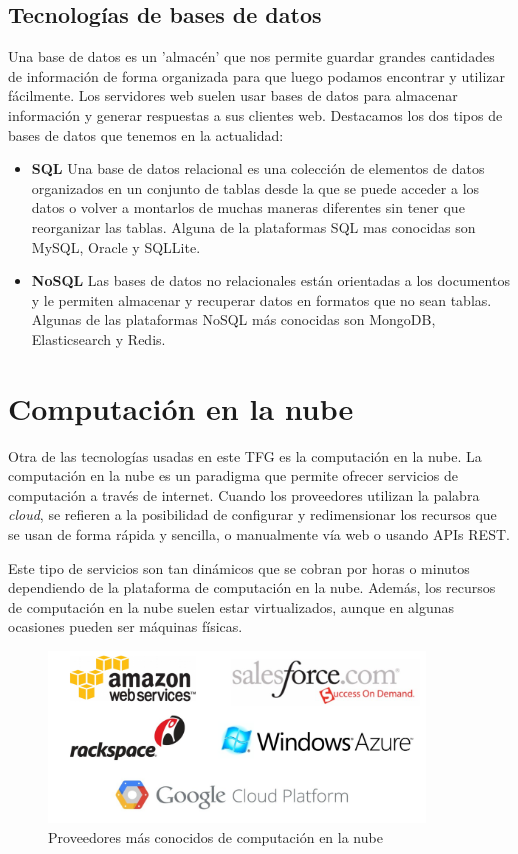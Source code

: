 \subsection{Tecnologías de bases de datos}
Una base de datos es un 'almacén' que nos permite guardar grandes cantidades de información de forma organizada para que luego podamos encontrar y utilizar fácilmente.
Los servidores web suelen usar bases de datos para almacenar información y generar respuestas a sus clientes web. Destacamos los dos tipos de bases de datos que tenemos en la actualidad:
\begin{itemize}
\item \textbf{SQL} Una base de datos relacional es una colección de elementos de datos organizados en un conjunto de tablas desde la que se puede acceder a los datos o volver a montarlos de muchas maneras diferentes sin tener que reorganizar las tablas. Alguna de la plataformas SQL mas conocidas son MySQL, Oracle y SQLLite.
\item \textbf{NoSQL} Las bases de datos no relacionales están orientadas a los documentos y le permiten almacenar y recuperar datos en formatos que no sean tablas. Algunas de las plataformas NoSQL más conocidas son MongoDB, Elasticsearch y Redis.
\end{itemize}

\section{Computación en la nube}
Otra de las tecnologías usadas en este TFG es la computación en la nube. La computación en la nube es un paradigma que permite ofrecer servicios de computación a través de internet. Cuando los proveedores utilizan la palabra \textit{cloud}, se refieren a la posibilidad de configurar y redimensionar los recursos que se usan de forma rápida y sencilla, o manualmente vía web o usando APIs REST.

Este tipo de servicios son tan dinámicos que se cobran por horas o minutos dependiendo de la plataforma de computación en la nube. Además, los recursos de computación en la nube suelen estar virtualizados, aunque en algunas ocasiones pueden ser máquinas físicas.
\begin{figure}[!h]
    \centering
    \includegraphics[width=100mm]{img/despliegue/proveedores.png}
    \caption{Proveedores más conocidos de computación en la nube}
\end{figure}

